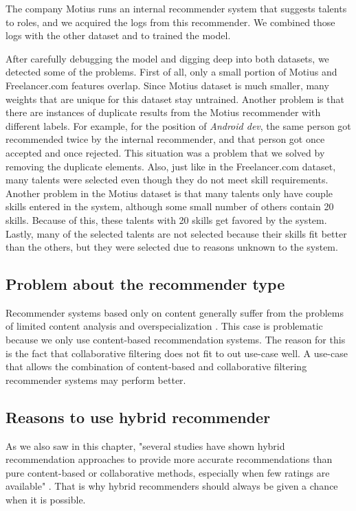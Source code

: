 The company Motius runs an internal recommender system that suggests talents to roles, and we acquired the logs from this recommender. We combined those logs with the other dataset and to trained the model.

After carefully debugging the model and digging deep into both datasets, we detected some of the problems. First of all, only a small portion of Motius and Freelancer.com features overlap. Since Motius dataset is much smaller, many weights that are unique for this dataset stay untrained. Another problem is that there are instances of duplicate results from the Motius recommender with different labels. For example, for the position of \textit{Android dev}, the same person got recommended twice by the internal recommender, and that person got once accepted and once rejected. This situation was a problem that we solved by removing the duplicate elements. Also, just like in the Freelancer.com dataset, many talents were selected even though they do not meet skill requirements. Another problem in the Motius dataset is that many talents only have couple skills entered in the system, although some small number of others contain 20 skills. Because of this, these talents with 20 skills get favored by the system. Lastly,  many of the selected talents are not selected because their skills fit better than the others, but they were selected due to reasons unknown to the system.

\subsection{Problem about the recommender type}

Recommender systems based only on content generally suffer from the problems of limited content analysis and overspecialization \cite{shardanand1995social}. This case is problematic because we only use content-based recommendation systems. The reason for this is the fact that collaborative filtering does not fit to out use-case well. A use-case that allows the combination of content-based and collaborative filtering recommender systems may perform better.

\subsection{Reasons to use hybrid recommender}

As we also saw in this chapter, "several studies have shown hybrid recommendation approaches to provide more accurate recommendations than pure content-based or collaborative methods, especially when few ratings are available" \cite{adomavicius2005toward}. That is why hybrid recommenders should always be given a chance when it is possible.


